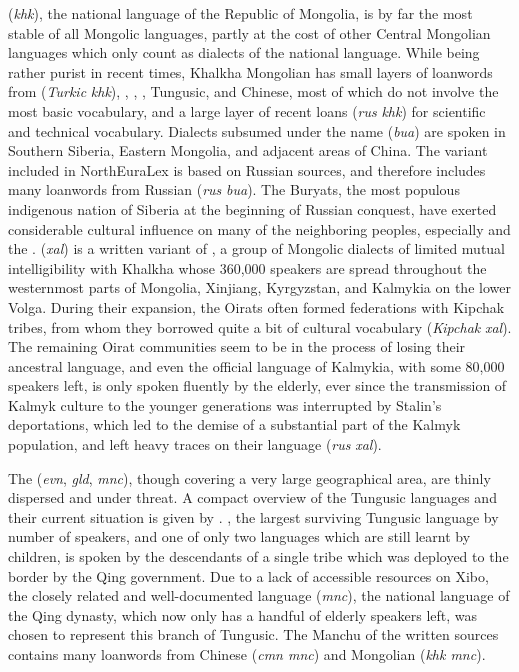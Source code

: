  (\textit{khk}), the national language of the Republic of Mongolia, is by far the most stable of all Mongolic languages, partly at the cost of other Central Mongolian languages which only count as dialects of the national language. While being rather purist in recent times, Khalkha Mongolian has small layers of loanwords from  (\textit{Turkic} \arrowLA \textit{khk}), , , , Tungusic, and Chinese, most of which do not involve the most basic vocabulary, and a large layer of recent  loans (\textit{rus} \arrowLA \textit{khk}) for scientific and technical vocabulary. Dialects subsumed under the name  (\textit{bua}) are spoken in Southern Siberia, Eastern Mongolia, and adjacent areas of China. The variant included in NorthEuraLex is based on Russian sources, and therefore includes many loanwords from Russian (\textit{rus} \arrowLA \textit{bua}). The Buryats, the most populous indigenous nation of Siberia at the beginning of Russian conquest, have exerted considerable cultural influence on many of the neighboring peoples, especially  and the .  (\textit{xal}) is a written variant of , a group of Mongolic dialects of limited mutual intelligibility with Khalkha whose 360,000 speakers are spread throughout the westernmost parts of Mongolia, Xinjiang, Kyrgyzstan, and Kalmykia on the lower Volga. During their expansion, the Oirats often formed federations with Kipchak tribes, from whom they borrowed quite a bit of cultural vocabulary (\textit{Kipchak} \arrowLA \textit{xal}). The remaining Oirat communities seem to be in the process of losing their ancestral language, and even the official language of Kalmykia, with some 80,000 speakers left, is only spoken fluently by the elderly, ever since the transmission of Kalmyk culture to the younger generations was interrupted by Stalin's deportations, which led to the demise of a substantial part of the Kalmyk population, and left heavy traces on their language (\textit{rus} \arrowLA \textit{xal}).

The  (\textit{evn}, \textit{gld}, \textit{mnc}), though covering a very large geographical area, are thinly dispersed and under threat. A compact overview of the Tungusic languages and their current situation is given by \cite{janhunen2005}. , the largest surviving Tungusic language by number of speakers, and one of only two languages which are still learnt by children, is spoken by the descendants of a single tribe which was deployed to the border by the Qing government. Due to a lack of accessible resources on Xibo, the closely related and well-documented  language (\textit{mnc}), the national language of the Qing dynasty, which now only has a handful of elderly speakers left, was chosen to represent this branch of Tungusic. The Manchu of the written sources contains many loanwords from Chinese (\textit{cmn \arrowLA mnc}) and Mongolian (\textit{khk \arrowLA mnc}).

